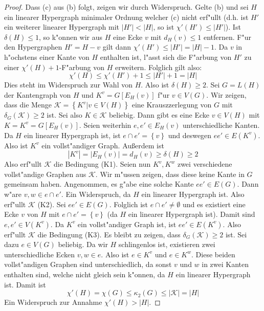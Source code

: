 \begin{proof}
  Dass (c) aus (b) folgt, zeigen wir durch Widerspruch. Gelte (b) und sei $H$ ein linearer Hypergraph minimaler Ordnung welcher (c) nicht erf"ullt (d.h. ist $H'$ ein weiterer linearer Hypergraph mit $|H'| < |H|$, so ist $\chi'(H') \leq | H'|$). Ist $\delta(H) \leq 1$, so k"onnen wir aus $H$ eine Ecke $v$ mit $d_H(v) \leq 1$ entfernen. F"ur den Hypergraphen $H' = H - v $ gilt dann $\chi'(H') \leq |H'| = |H|-1$. Da $v$ in h"ochstens einer Kante von $H$ enthalten ist, l"asst sich die F"arbung
  von $H'$ zu einer $\chi'(H) +1$-F"arbung von $H$ erweitern. Folglich gilt also:
  $$\chi'(H) \leq \chi'(H') +1 \leq |H'| + 1 = |H| $$
  Dies steht im Widerspruch zur Wahl von  $H$.  Also ist $\delta(H) \geq 2$. Sei $G=L(H)$ der Kantengraph von $H$ und $K^{v} = G[E_H(v)]$ f"ur $v\in V(G)$. 
  Wir zeigen, dass die Menge $\mathcal K = \left\{ K^{v}| v \in V(H) \right\}$ eine Krauszzerlegung von $G$  mit $\delta_{G}(\mathcal{K}) \geq 2$ ist.
  Sei also $K \in \mathcal{K} $ beliebig. Dann gibt es eine Ecke $v\in V(H)$ mit $K = K^{v} = G[E_{H}(v)]$. Seien weiterhin $e,e' \in E_H(v)$ unterschiedliche Kanten. Da $H$ ein linearer Hypergraph ist, ist $e\cap e' = \left\{ v \right\}$ und deswegen $ee'\in E(K^{v})$. Also ist $K^{v}$ ein vollst"andiger Graph.
  Au{\ss}erdem ist \begin{equation*}
    |K^{v}| = |E_{H}(v)|= d_{H}(v) \geq \delta(H) \geq 2
  \end{equation*}
  Also erf"ullt $\mathcal{K}$ die Bedingung (K1). Seien nun $K^{v},K^{w}$ zwei verschiedene vollst"andige Graphen aus $\mathcal{K}$. Wir m"ussen zeigen, dass diese keine Kante in $G$ gemeinsam haben. Angenommen, es g"abe eine solche Kante $ee'\in E(G)$. Dann w"are $v,w \in e \cap e'$. Ein Widerspruch, da $H$ ein linearer Hypergraph ist. Also erf"ullt  $\mathcal{K}$ (K2). Sei $ee'\in E(G)$. Folglich ist $e\cap e' \neq \emptyset$ und es existiert eine Ecke $v$ von $H$ mit $e \cap e ' = \left\{ v
  \right\}$ (da $H$ ein linearer Hypergraph ist). Damit sind $e,e'\in V(K^{v})$. Da $K^{v}$ ein vollst"andiger Graph ist, ist $ee'\in E(K^{v})$. Also erf"ullt $\mathcal{K}$ die Bedingung (K3). 
  Es bleibt zu zeigen, dass $\delta_{G}(\mathcal{K}) \geq 2$ ist. Sei dazu $e \in V(G)$ beliebig. Da wir $H$ schlingenlos ist, existieren zwei unterschiedliche Ecken $v,w \in e$. Also ist $e\in K^{v}$ und $e\in K^{w}$. Diese beiden vollst"andigen Graphen sind unterschiedlich, da sonst $v$ und $w$ in zwei Kanten enthalten sind, welche nicht gleich sein k"onnen, da $H$ ein linearer Hypergraph ist.  
  Damit ist \begin{equation*}
    \chi'(H) = \chi(G) \leq \kappa_{2}(G) \leq |\mathcal{K}| = |H|
  \end{equation*}
  Ein Widerspruch zur Annahme $\chi'(H) > |H|$.
\end{proof}


